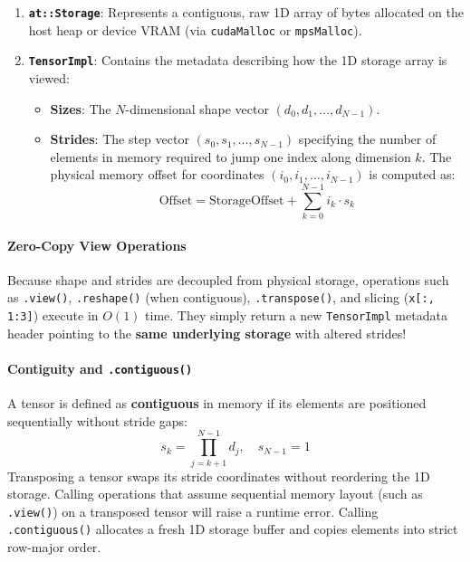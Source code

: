 \documentclass[11pt,a4paper]{article}
\begin{document}
\begin{enumerate}
    \item \textbf{\texttt{at::Storage}}: Represents a contiguous, raw 1D array of bytes allocated on the host heap or device VRAM (via \texttt{cudaMalloc} or \texttt{mpsMalloc}).
    \item \textbf{\texttt{TensorImpl}}: Contains the metadata describing how the 1D storage array is viewed:
    \begin{itemize}
        \item \textbf{Sizes}: The $N$-dimensional shape vector $(d_0, d_1, \dots, d_{N-1})$.
        \item \textbf{Strides}: The step vector $(s_0, s_1, \dots, s_{N-1})$ specifying the number of elements in memory required to jump one index along dimension $k$. The physical memory offset for coordinates $(i_0, i_1, \dots, i_{N-1})$ is computed as:
        \begin{equation}
            \text{Offset} = \text{StorageOffset} + \sum_{k=0}^{N-1} i_k \cdot s_k
        \end{equation}
    \end{itemize}
\end{enumerate}

\paragraph{Zero-Copy View Operations}
Because shape and strides are decoupled from physical storage, operations such as \texttt{.view()}, \texttt{.reshape()} (when contiguous), \texttt{.transpose()}, and slicing (\texttt{x[:, 1:3]}) execute in $O(1)$ time. They simply return a new \texttt{TensorImpl} metadata header pointing to the \textbf{same underlying storage} with altered strides!

\paragraph{Contiguity and \texttt{.contiguous()}}
A tensor is defined as \textbf{contiguous} in memory if its elements are positioned sequentially without stride gaps:
\begin{equation}
    s_k = \prod_{j=k+1}^{N-1} d_j, \quad s_{N-1} = 1
\end{equation}
Transposing a tensor swaps its stride coordinates without reordering the 1D storage. Calling operations that assume sequential memory layout (such as \texttt{.view()}) on a transposed tensor will raise a runtime error. Calling \texttt{.contiguous()} allocates a fresh 1D storage buffer and copies elements into strict row-major order.
\end{document}

